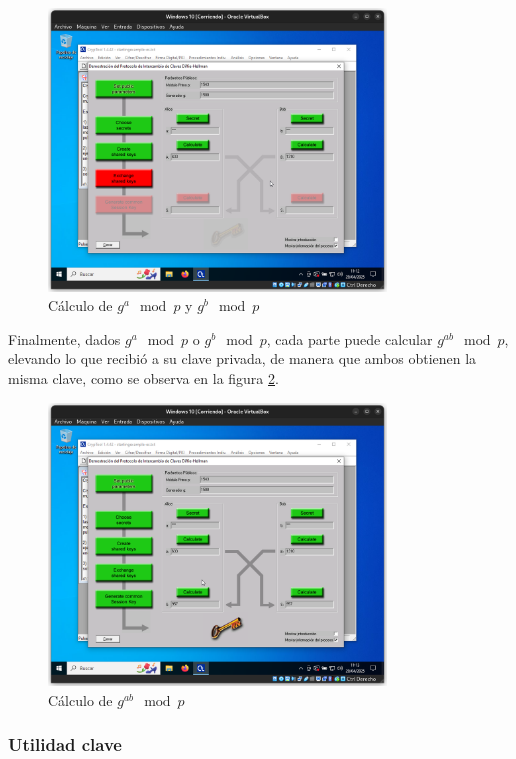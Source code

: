 \begin{figure}[H]
    \centering
    \includegraphics[width=0.8\textwidth]{D&H-5.png}
    \caption{Cálculo de $g^a\mod{p}$ y $g^b\mod{p}$}
    \label{fig:modulos}
\end{figure}

Finalmente, dados $g^a\mod{p}$ o $g^b\mod{p}$, cada parte puede calcular $g^{ab}\mod{p}$, elevando lo que recibió a su clave privada, de manera que ambos obtienen la misma clave, como se observa en la figura \ref{fig:gabmodp}.

\begin{figure}[H]
    \centering
    \includegraphics[width=0.8\textwidth]{D&H-6.png}
    \caption{Cálculo de $g^{ab}\mod{p}$}
    \label{fig:gabmodp}
\end{figure}


\subsubsection{Utilidad clave}


